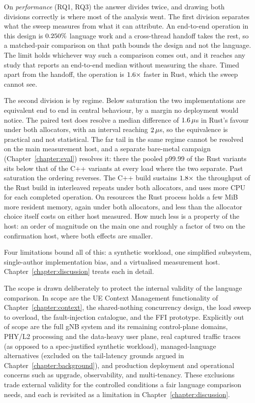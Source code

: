 \documentclass[english,twoside,openright,a4paper,censored,csm,software-track-2020]{HYthesisML}
\begin{document}
On \emph{performance} (RQ1, RQ3) the answer divides twice, and drawing both divisions correctly is
where most of the analysis went. The first division separates what the sweep measures from what it
can attribute. An end-to-end operation in this design is $0.250\%$ language work and
a cross-thread handoff takes the rest, so a matched-pair comparison on that path bounds the design
and not the language. The limit holds whichever way such a comparison comes out, and it reaches
any study that reports an end-to-end median without measuring the share. Timed apart from the
handoff, the operation is $1.6\times$ faster in Rust, which the sweep cannot see.

The second division is by regime. Below saturation the two implementations are equivalent end to
end in central behaviour, by a margin no deployment would notice. The paired test does resolve a
median difference of $1.6\,\mu$s in Rust's favour under both allocators, with an
interval reaching $2\,\mu$s, so the equivalence is practical and not statistical.
The far tail in the same regime cannot be resolved on the main measurement host, and a separate
bare-metal campaign (Chapter~\ref{chapter:eval}) resolves it: there the pooled p99.99 of the
Rust variants sits below that of the C++ variants at every load where the two separate. Past saturation
the ordering reverses. The C++ build sustains $1.8\times$ the throughput of the Rust
build in \OverloadThrAgree{} interleaved repeats under both allocators, and uses more CPU for each
completed operation. On resources the Rust process holds a few MiB more resident memory, again
under both allocators, and less than the allocator choice itself costs on either host measured. How
much less is a property of the host: an order of magnitude on the main one and roughly a factor of
two on the confirmation host, where both effects are smaller.

Four limitations bound all of this: a synthetic workload, one simplified subsystem,
single-author implementation bias, and a virtualised measurement host.
Chapter~\ref{chapter:discussion} treats each in detail.

The scope is drawn deliberately to protect the internal validity of the language comparison. In
scope are the UE Context Management functionality of Chapter~\ref{chapter:context}, the
shared-nothing concurrency design, the load sweep to overload, the fault-injection catalogue,
and the FFI prototype. Explicitly out of scope are the full gNB system and its remaining
control-plane domains, PHY/L2 processing and the data-heavy user plane, real captured traffic
traces (as opposed to a spec-justified synthetic workload), managed-language alternatives
(excluded on the tail-latency grounds argued in Chapter~\ref{chapter:background}), and
production deployment and operational concerns such as upgrade, observability, and
multi-tenancy. These exclusions trade external validity for the controlled conditions a fair
language comparison needs, and each is revisited as a limitation in
Chapter~\ref{chapter:discussion}.
\end{document}
